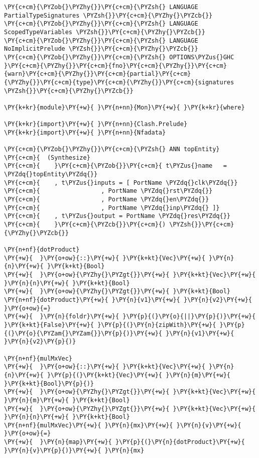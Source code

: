 {\scriptsize
\begin{Verbatim}[commandchars=\\\{\}]
\PY{c+cm}{\PYZob{}\PYZhy{}}\PY{c+cm}{\PYZsh{} LANGUAGE PartialTypeSignatures \PYZsh{}}\PY{c+cm}{\PYZhy{}\PYZcb{}}
\PY{c+cm}{\PYZob{}\PYZhy{}}\PY{c+cm}{\PYZsh{} LANGUAGE ScopedTypeVariables \PYZsh{}}\PY{c+cm}{\PYZhy{}\PYZcb{}}
\PY{c+cm}{\PYZob{}\PYZhy{}}\PY{c+cm}{\PYZsh{} LANGUAGE NoImplicitPrelude \PYZsh{}}\PY{c+cm}{\PYZhy{}\PYZcb{}}
\PY{c+cm}{\PYZob{}\PYZhy{}}\PY{c+cm}{\PYZsh{} OPTIONS\PYZus{}GHC }\PY{c+cm}{\PYZhy{}}\PY{c+cm}{fno}\PY{c+cm}{\PYZhy{}}\PY{c+cm}{warn}\PY{c+cm}{\PYZhy{}}\PY{c+cm}{partial}\PY{c+cm}{\PYZhy{}}\PY{c+cm}{type}\PY{c+cm}{\PYZhy{}}\PY{c+cm}{signatures \PYZsh{}}\PY{c+cm}{\PYZhy{}\PYZcb{}}

\PY{k+kr}{module}\PY{+w}{ }\PY{n+nn}{Mon}\PY{+w}{ }\PY{k+kr}{where}

\PY{k+kr}{import}\PY{+w}{ }\PY{n+nn}{Clash.Prelude}
\PY{k+kr}{import}\PY{+w}{ }\PY{n+nn}{Nfadata}

\PY{c+cm}{\PYZob{}\PYZhy{}}\PY{c+cm}{\PYZsh{} ANN topEntity}
\PY{c+cm}{  (Synthesize}
\PY{c+cm}{    }\PY{c+cm}{\PYZob{}}\PY{c+cm}{ t\PYZus{}name   = \PYZdq{}topEntity\PYZdq{}}
\PY{c+cm}{    , t\PYZus{}inputs = [ PortName \PYZdq{}clk\PYZdq{}}
\PY{c+cm}{                 , PortName \PYZdq{}rst\PYZdq{}}
\PY{c+cm}{                 , PortName \PYZdq{}en\PYZdq{}}
\PY{c+cm}{                 , PortName \PYZdq{}inp\PYZdq{} ]}
\PY{c+cm}{    , t\PYZus{}output = PortName \PYZdq{}res\PYZdq{}}
\PY{c+cm}{    }\PY{c+cm}{\PYZcb{}}\PY{c+cm}{) \PYZsh{}}\PY{c+cm}{\PYZhy{}\PYZcb{}}

\PY{n+nf}{dotProduct}
\PY{+w}{  }\PY{o+ow}{::}\PY{+w}{ }\PY{k+kt}{Vec}\PY{+w}{ }\PY{n}{n}\PY{+w}{ }\PY{k+kt}{Bool}
\PY{+w}{  }\PY{o+ow}{\PYZhy{}\PYZgt{}}\PY{+w}{ }\PY{k+kt}{Vec}\PY{+w}{ }\PY{n}{n}\PY{+w}{ }\PY{k+kt}{Bool}
\PY{+w}{  }\PY{o+ow}{\PYZhy{}\PYZgt{}}\PY{+w}{ }\PY{k+kt}{Bool}
\PY{n+nf}{dotProduct}\PY{+w}{ }\PY{n}{v1}\PY{+w}{ }\PY{n}{v2}\PY{+w}{ }\PY{o+ow}{=}
\PY{+w}{  }\PY{n}{foldr}\PY{+w}{ }\PY{p}{(}\PY{o}{||}\PY{p}{)}\PY{+w}{ }\PY{k+kt}{False}\PY{+w}{ }\PY{p}{(}\PY{n}{zipWith}\PY{+w}{ }\PY{p}{(}\PY{o}{\PYZam{}\PYZam{}}\PY{p}{)}\PY{+w}{ }\PY{n}{v1}\PY{+w}{ }\PY{n}{v2}\PY{p}{)}

\PY{n+nf}{mulMxVec}
\PY{+w}{  }\PY{o+ow}{::}\PY{+w}{ }\PY{k+kt}{Vec}\PY{+w}{ }\PY{n}{n}\PY{+w}{ }\PY{p}{(}\PY{k+kt}{Vec}\PY{+w}{ }\PY{n}{m}\PY{+w}{ }\PY{k+kt}{Bool}\PY{p}{)}
\PY{+w}{  }\PY{o+ow}{\PYZhy{}\PYZgt{}}\PY{+w}{ }\PY{k+kt}{Vec}\PY{+w}{ }\PY{n}{m}\PY{+w}{ }\PY{k+kt}{Bool}
\PY{+w}{  }\PY{o+ow}{\PYZhy{}\PYZgt{}}\PY{+w}{ }\PY{k+kt}{Vec}\PY{+w}{ }\PY{n}{n}\PY{+w}{ }\PY{k+kt}{Bool}
\PY{n+nf}{mulMxVec}\PY{+w}{ }\PY{n}{mx}\PY{+w}{ }\PY{n}{v}\PY{+w}{ }\PY{o+ow}{=}
\PY{+w}{  }\PY{n}{map}\PY{+w}{ }\PY{p}{(}\PY{n}{dotProduct}\PY{+w}{ }\PY{n}{v}\PY{p}{)}\PY{+w}{ }\PY{n}{mx}


\end{Verbatim}}
